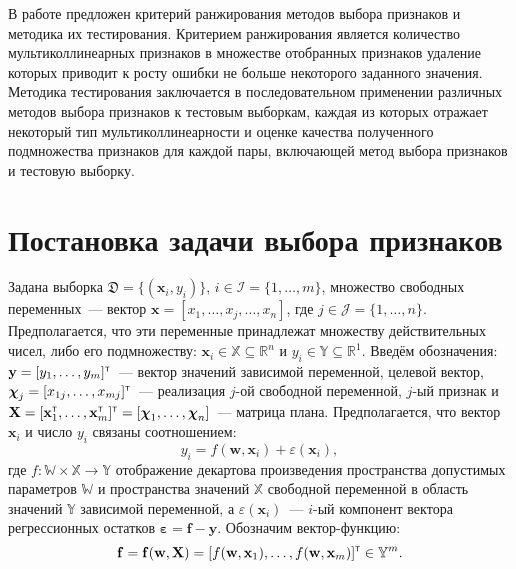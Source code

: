 \documentclass[a4paper,12pt]{article}
\newcommand{\bx}{\mathbf{x}}
\newcommand{\bw}{\mathbf{w}}
\newcommand{\by}{\mathbf{y}}
\newcommand{\bchi}{\boldsymbol{\chi}}
\newcommand{\frakD}{\mathfrak{D}}
\newcommand{\T}{{\text{\tiny\sffamily\upshape\mdseries T}}}
\begin{document}
В работе предложен критерий ранжирования методов выбора признаков и методика их тестирования. Критерием ранжирования является количество мультиколлинеарных признаков в множестве отобранных признаков удаление которых приводит к росту ошибки не больше некоторого заданного значения.
Методика тестирования заключается в последовательном применении различных методов выбора признаков к тестовым выборкам, каждая из которых отражает некоторый тип мультиколлинеарности и оценке качества полученного подмножества признаков для каждой пары, включающей метод выбора признаков и тестовую выборку. 

\section{Постановка задачи выбора признаков}

Задана выборка $\frakD = \{ (\bx_i, y_i) \}$, $i \in \mathcal{I} = \{1, \ldots, m \} $, множество свободных переменных~--- вектор $\bx = [x_1, \ldots, x_j, \ldots, x_n] $, где $j \in \mathcal{J} = \{ 1, \ldots, n\}$. Предполагается, что эти переменные принадлежат множеству действительных чисел, либо его подмножеству: $\bx_i \in \mathbb{X} \subseteq \mathbb{R}^n$ и $y_i \in \mathbb{Y} \subseteq \mathbb{R}^1$. Введём обозначения: $\by = [y_1, \ldots, y_m]^{\T}$~--- вектор значений зависимой переменной, целевой вектор, $\bchi_j = [x_{1j}, \ldots, x_{mj}]^{\T}$~--- реализация $j$-ой свободной переменной, $j$-ый признак и $\mathbf{X} = [\bx^{\T}_1, \ldots, \bx^{\T}_m]^{\T} = [\bchi_1, \ldots, \bchi_n]$~--- матрица плана. Предполагается, что вектор $\bx_i$ и число $y_i$ связаны соотношением:
\begin{equation}
y_i = f(\bw, \bx_i) + \varepsilon(\bx_i),
\label{eq:regr}
\end{equation}
где $f: \mathbb{W} \times \mathbb{X} \rightarrow \mathbb{Y}$ отображение декартова произведения пространства допустимых параметров $\mathbb{W}$ и пространства значений $\mathbb{X}$ свободной переменной в область значений $\mathbb{Y}$ зависимой переменной, а $\varepsilon(\bx_i)$~--- $i$-ый компонент вектора регрессионных остатков $\boldsymbol{\varepsilon} = \mathbf{f} - \by$. Обозначим вектор-функцию: 
\begin{equation*}
\mathbf{f} = \mathbf{f}(\bw, \mathbf{X}) = [f(\bw, \bx_1), \ldots, f(\bw, \bx_m)]^{\T} \in \mathbb{Y}^m.
\label{eq:model}
\end{equation*}
\end{document}
